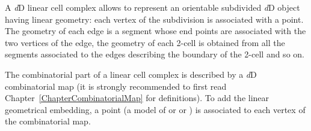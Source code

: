 A \emph{d}D linear cell complex allows to represent an orientable
subdivided \emph{d}D object having linear geometry: each vertex of the
subdivision is associated with a point. The geometry of each edge is a
segment whose end points are associated with the two vertices of the
edge, the geometry of each 2-cell is obtained from all the segments
associated to the edges describing the boundary of the 2-cell and so
on.

The combinatorial part of a linear cell complex is described by a
\emph{d}D combinatorial map (it is strongly recommended to first
read Chapter~\ref{ChapterCombinatorialMap} for definitions).  To add
the linear geometrical embedding, a point (a model of
 or  or ) is
associated to each vertex of the combinatorial map.

